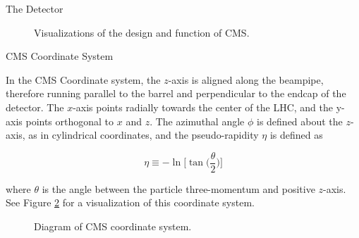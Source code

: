\documentclass[oneside,12pt,final]{sty/ucthesis-CA2012}
\begin{document}
\begin{mainmatter}
\begin{section}{The Detector}
\begin{figure}[htb]
\begin{center}
\quad
{}
\end{center}
\caption{Visualizations of the design and function of CMS.}
\label{fig:cms-xsec}
\end{figure}

\end{section}
\begin{section}{CMS Coordinate System}

In the CMS Coordinate system, the $z$-axis is aligned along the beampipe, therefore running parallel to the barrel and perpendicular to the endcap of the detector. The $x$-axis points radially towards the center of the LHC, and the y-axis points orthogonal to $x$ and $z$. The azimuthal angle $\phi$ is defined about the $z$-axis, as in cylindrical coordinates, and the pseudo-rapidity $\eta$ is defined as

\begin{equation}
    \eta \equiv -\ln{\bigg[ \tan{\bigg( \frac{\theta}{2} \bigg)} \bigg]}
\end{equation}

\noindent where $\theta$ is the angle between the particle three-momentum and positive $z$-axis. See Figure \ref{fig:cms-coords} for a visualization of this coordinate system.

\begin{figure}[htb]
\begin{center}

\end{center}
\caption{Diagram of CMS coordinate system.}
\label{fig:cms-coords}
\end{figure}

\end{section}
\end{mainmatter}

\ssp


\end{document}
